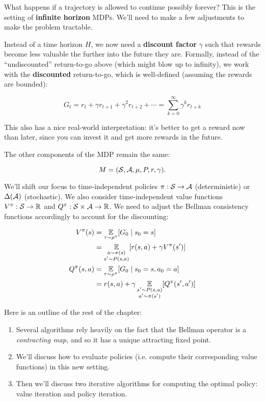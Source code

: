 \documentclass[../main/main]{subfiles}
\begin{document}
What happens if a trajectory is allowed to continue possibly forever? This is the setting of \textbf{infinite horizon} MDPs. We'll need to make a few adjustments to make the problem tractable.

Instead of a time horizon $H$, we now need a \textbf{discount factor} $\gamma$ such that rewards become less valuable the further into the future they are. Formally, instead of the ``undiscounted'' return-to-go above (which might blow up to infinity), we work with the \textbf{discounted} return-to-go, which is well-defined (assuming the rewards are bounded):

\[
    G_t = r_t + \gamma r_{t+1} + \gamma^2 r_{t+2} + \cdots = \sum_{k=0}^\infty \gamma^k r_{t+k}
\]


This also has a nice real-world interpretation: it's better to get a reward now than later, since you can invest it and get more rewards in the future.

The other components of the MDP remain the same:

\[ M = (\mathcal{S}, \mathcal{A}, \mu, P, r, \gamma). \]

We'll shift our focus to time-independent policies $\pi : \mathcal{S} \to \mathcal{A}$ (deterministic) or $\Delta(\mathcal{A})$ (stochastic). We also consider time-independent value functions $V^\pi : \mathcal{S} \to \mathbb{R}$ and $Q^\pi : \mathcal{S} \times \mathcal{A} \to \mathbb{R}$. We need to adjust the Bellman consistency functions accordingly to account for the discounting:

\begin{align*}
    V^\pi(s) &= \operatorname*{\mathbb{E}}_{\tau \sim \rho^\pi} [G_0 \mid s_0 = s] \\
    &= \operatorname*{\mathbb{E}}_{\substack{a \sim \pi(s) \\ s' \sim P(s, a)}} [r(s, a) + \gamma V^\pi(s')]\\
    Q^\pi(s, a) &= \operatorname*{\mathbb{E}}_{\tau \sim \rho^\pi} [G_0 \mid s_0 = s, a_0 = a] \\
    &= r(s, a) + \gamma \operatorname*{\mathbb{E}}_{\substack{s' \sim P(s, a) \\ a' \sim \pi(s')}} [Q^\pi(s', a')]
\end{align*}

Here is an outline of the rest of the chapter:

\begin{enumerate}
    \item Several algorithms rely heavily on the fact that the Bellman operator is a \emph{contracting map}, and so it has a unique attracting fixed point.
    \item We'll discuss how to evaluate policies (i.e. compute their corresponding value functions) in this new setting.
    \item Then we'll discuss two iterative algorithms for computing the optimal policy: value iteration and policy iteration.
\end{enumerate}
\end{document}
